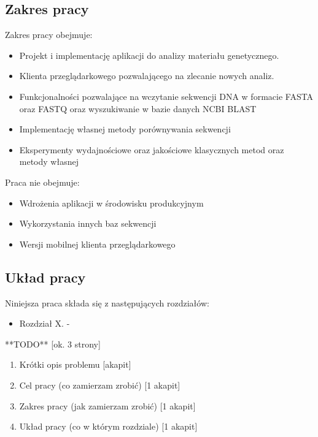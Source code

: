 \subsection {
    Zakres pracy
}

Zakres pracy obejmuje:
\begin{itemize}
    \item Projekt i implementację aplikacji do analizy materiału genetycznego.
    \item Klienta przeglądarkowego pozwalającego na zlecanie nowych analiz.
    \item {
        Funkcjonalności pozwalające na wczytanie sekwencji DNA w formacie FASTA oraz FASTQ
        oraz wyszukiwanie w bazie danych NCBI BLAST
    }
    \item Implementację własnej metody porównywania sekwencji 
    \item Eksperymenty wydajnościowe oraz jakościowe klasycznych metod oraz metody własnej
\end{itemize}

Praca nie obejmuje:
\begin{itemize}
    \item Wdrożenia aplikacji w środowisku produkcyjnym
    \item Wykorzystania innych baz sekwencji
    \item Wersji mobilnej klienta przeglądarkowego
\end{itemize}

\subsection {
    Układ pracy
}

Niniejsza praca składa się z następujących rozdziałów:

\begin{itemize}
    \item Rozdział X. - 
\end{itemize}















**TODO** [ok. 3 strony]

\begin{enumerate}
    \item Krótki opis problemu [akapit]
    \item Cel pracy (co zamierzam zrobić) [1 akapit]
    \item Zakres pracy (jak zamierzam zrobić) [1 akapit]
    \item Układ pracy (co w którym rozdziale) [1 akapit]
\end{enumerate}



